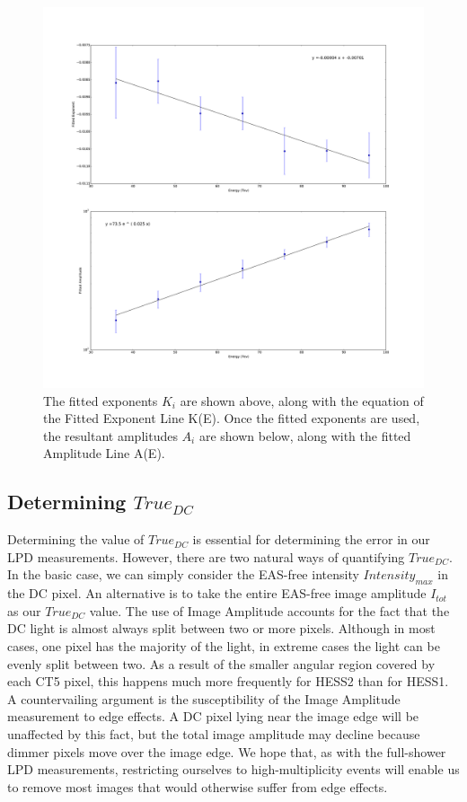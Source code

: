 \documentclass{article}
\begin{document}
\begin{figure}
\begin{center}
\includegraphics[width=\textwidth]{lpdpowerlaw}
\caption{The fitted exponents $K_{i}$ are shown above, along with the equation of the Fitted Exponent Line K(E). Once the fitted exponents are used, the resultant amplitudes $A_{i}$ are shown below, along with the fitted Amplitude Line A(E).}
\label{fig:powerlawlpd}
\end{center}
\end{figure}

\subsection{Determining $True_{DC}$}
Determining the value of $True_{DC}$ is essential for determining the error in our LPD measurements. However, there are two natural ways of quantifying $True_{DC}$. In the basic case, we can simply consider the EAS-free intensity $Intensity_{max}$ in the DC pixel. An alternative is to take the entire EAS-free image amplitude $I_{tot}$ as our $True_{DC}$ value. The use of Image Amplitude accounts for the fact that the DC light is almost always split between two or more pixels. Although in most cases, one pixel has the majority of the light, in extreme cases the light can be evenly split between two. As a result of the smaller angular region covered by each CT5 pixel, this happens much more frequently for HESS2 than for HESS1. A countervailing argument is the susceptibility of the Image Amplitude measurement to edge effects. A DC pixel lying near the image edge will be unaffected by this fact, but the total image amplitude may decline because dimmer pixels move over the image edge. We hope that, as with the full-shower LPD measurements, restricting ourselves to high-multiplicity events will enable us to remove most images that would otherwise suffer from edge effects.
\end{document}
